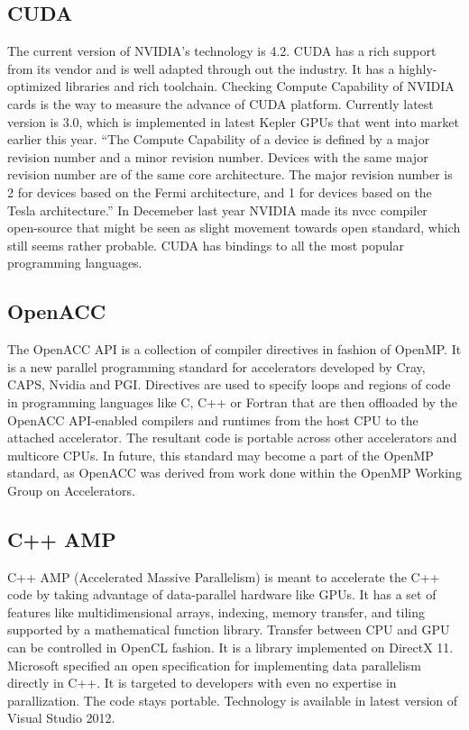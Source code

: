 \subsection{CUDA}
The current version of NVIDIA's technology is 4.2. CUDA has a rich support from its vendor and is well adapted through out the industry. It has a highly-optimized libraries and rich toolchain. Checking Compute Capability of NVIDIA cards is the way to measure the advance of CUDA platform. Currently latest version is 3.0, which is implemented in latest Kepler GPUs that went into market earlier this year. \enquote{The Compute Capability of a device is defined by a major revision number and a minor revision number. Devices with the same major revision number are of the same core architecture. The major revision number is 2 for devices based on the Fermi architecture, and 1 for devices based on the Tesla architecture.}\cite{nvidia2012openclprog} In Decemeber last year NVIDIA made its nvcc compiler open-source that might be seen as slight movement towards open standard, which still seems rather probable.\cite{hpcwire2012nvidia} CUDA has bindings to all the most popular programming languages.

\subsection{OpenACC}
The OpenACC API is a collection of compiler directives in fashion of OpenMP.\cite{openacc2012, openacc2012news2} It is a new parallel programming standard for accelerators developed by Cray, CAPS, Nvidia and PGI.  Directives are used to specify loops and regions of code in programming languages like C, C++ or Fortran that are then offloaded by the OpenACC API-enabled compilers and runtimes from the host CPU to the attached accelerator. The resultant code is portable across other accelerators and multicore CPUs. In future, this standard may become a part of the OpenMP standard, as OpenACC was derived from work done within the OpenMP Working Group on Accelerators.

\subsection{C++ AMP}
C++ AMP (Accelerated Massive Parallelism) is meant to accelerate the C++ code by taking advantage of data-parallel hardware like GPUs.\cite{microsoft2012cppamp, microsoft2012cppamp2} It has a set of features like multidimensional arrays, indexing, memory transfer, and tiling supported by a mathematical function library. Transfer between CPU and GPU can be controlled in OpenCL fashion. It is a library implemented on DirectX 11. Microsoft specified an open specification for implementing data parallelism directly in C++. It is targeted to developers with even no expertise in parallization. The code stays portable. Technology is available in latest version of Visual Studio 2012.


